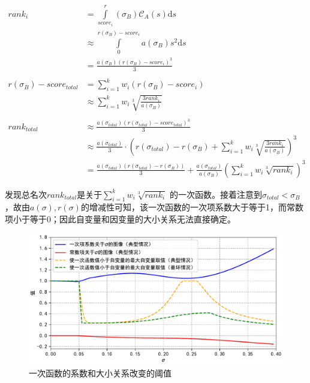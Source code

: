             \begin{align*}
                \textit{rank}_i
                &=\int\limits_{\textit{score}_i}^r(\sigma_B) \mathcal{C}_A(s) \mathrm{d}s \\
                &\approx\int\limits_0^{r(\sigma_B)-\textit{score}_i} a(\sigma_B) s^2 \mathrm{d}s \\
                &=\frac{a(\sigma_B)\left(r(\sigma_B)-\textit{score}_i\right)^3}3\\
                \\
                r(\sigma_B)-\textit{score}_{\textit{total}}
                &=\sum\limits_{i=1}^k w_i\left(r(\sigma_B)-\textit{score}_i\right) \\
                &\approx\sum\limits_{i=1}^k w_i\sqrt[3]{\frac{3\textit{rank}_i}{a(\sigma_B)}} \\
                \\
                \textit{rank}_{\textit{total}}
                &\approx\frac{a(\sigma_{\textit{total}})(r(\sigma_{\textit{total}})-\textit{score}_{\textit{total}})^3}3 \\
                &\approx\frac{a(\sigma_{\textit{total}})}{3}\cdot\left(r(\sigma_{\textit{total}})-r(\sigma_B)+\sum\limits_{i=1}^k w_i\sqrt[3]{\frac{3\textit{rank}_i}{a(\sigma_B)}}\right)^3 \\
                &=\frac{a(\sigma_{\textit{total}})\left(r(\sigma_{\textit{total}})-r(\sigma_B)\right)}{3}+\frac{a(\sigma_{\textit{total}})}{a(\sigma_B)}\left(\sum\limits_{i=1}^k w_i\sqrt[3]{\textit{rank}_i}\right)^3
            \end{align*}

            发现总名次$\textit{rank}_{\textit{total}}$是关于$\sum_{i=1}^k w_i\sqrt[3]{\textit{rank}_i}$ 的一次函数。接着注意到$\sigma_{\textit{total}}<\sigma_B$，故由$a(\sigma),r(\sigma)$的增减性可知，该一次函数的一次项系数大于等于1，而常数项小于等于0；因此自变量和因变量的大小关系无法直接确定。

            \begin{figure}[htbp]
                \centering
                \includegraphics[width=\textwidth]{fig/plottingKandB.pdf}
                \caption{一次函数的系数和大小关系改变的阈值}
                \label{fig:plottingKandB}
            \end{figure}

